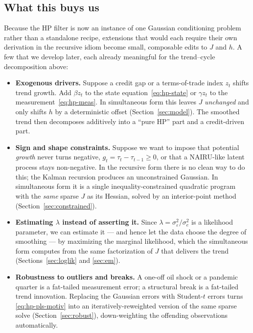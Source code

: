 \documentclass[11pt]{article}
\begin{document}
\subsection{What this buys us}

Because the HP filter is now an instance of one Gaussian conditioning
problem rather than a standalone recipe, extensions that would each
require their own derivation in the recursive idiom become small,
composable edits to $J$ and $h$.  A few that we develop later, each
already meaningful for the trend--cycle decomposition above:

\begin{itemize}[leftmargin=2em,itemsep=4pt]

\item \textbf{Exogenous drivers.}  Suppose a credit gap or a terms-of-trade
index $z_t$ shifts trend growth.  Add $\beta z_t$ to the state
equation~\eqref{eq:hp-state} or $\gamma z_t$ to the
measurement~\eqref{eq:hp-meas}.  In simultaneous form this leaves $J$
\emph{unchanged} and only shifts $h$ by a deterministic offset
(Section~\ref{sec:model}).  The smoothed trend then decomposes
additively into a ``pure HP'' part and a credit-driven part.

\item \textbf{Sign and shape constraints.}  Suppose we want to impose
that potential \emph{growth} never turns negative, $g_t=\tau_t-\tau_{t-1}\ge 0$,
or that a NAIRU-like latent process stays non-negative.  In the recursive
form there is no clean way to do this; the Kalman recursion produces an
unconstrained Gaussian.  In simultaneous form it is a single
inequality-constrained quadratic program with the \emph{same} sparse
$J$ as its Hessian, solved by an interior-point method
(Section~\ref{sec:constrained}).

\item \textbf{Estimating $\lambda$ instead of asserting it.}  Since
$\lambda=\sigma_\varepsilon^2/\sigma_e^2$ is a likelihood parameter, we
can estimate it --- and hence let the data choose the degree of
smoothing --- by maximizing the marginal likelihood, which the
simultaneous form computes from the same factorization of $J$ that
delivers the trend (Sections~\ref{sec:loglik} and \ref{sec:em}).

\item \textbf{Robustness to outliers and breaks.}  A one-off oil shock
or a pandemic quarter is a fat-tailed measurement error; a structural
break is a fat-tailed trend innovation.  Replacing the Gaussian errors
with Student-$t$ errors turns \eqref{eq:hp-pls-motiv} into an
iteratively-reweighted version of the same sparse solve
(Section~\ref{sec:robust}), down-weighting the offending observations
automatically.


\end{itemize}
\end{document}
